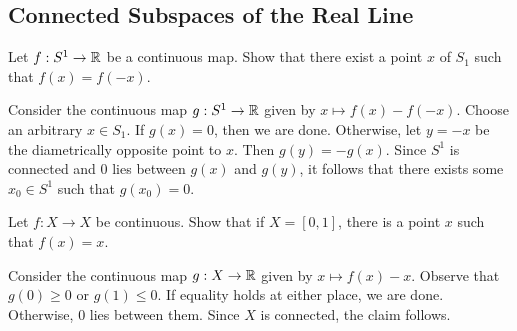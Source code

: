
\subsection{Connected Subspaces of the Real Line}

	\setcounter{exercise}{1}
	\begin{exercise}
		Let $f:S^1\to\mathbb{R}$ be a continuous map. Show that there exist a point $x$ of $S_1$ such that $f(x)=f(-x)$.
	\end{exercise}
	\begin{solution*}
		Consider the continuous map $g:S^1\to\mathbb{R}$ given by $x\mapsto f(x)-f(-x)$. Choose an arbitrary $x\in S_1$. If $g(x)=0$, then we are done. Otherwise, let $y=-x$ be the diametrically opposite point to $x$. Then $g(y)=-g(x)$. Since $S^1$ is connected and $0$ lies between $g(x)$ and $g(y)$, it follows that there exists some $x_0\in S^1$ such that $g(x_0)=0$.
	\end{solution*}

	\begin{exercise}
		Let $f:X\to X$ be continuous. Show that if $X=[0,1]$, there is a point $x$ such that $f(x)=x$.
	\end{exercise}
	\begin{solution*}
		Consider the continuous map $g:X\to\mathbb{R}$ given by $x\mapsto f(x)-x$. Observe that $g(0)\geq 0$ or $g(1)\leq 0$. If equality holds at either place, we are done. Otherwise, $0$ lies between them. Since $X$ is connected, the claim follows.
	\end{solution*}


